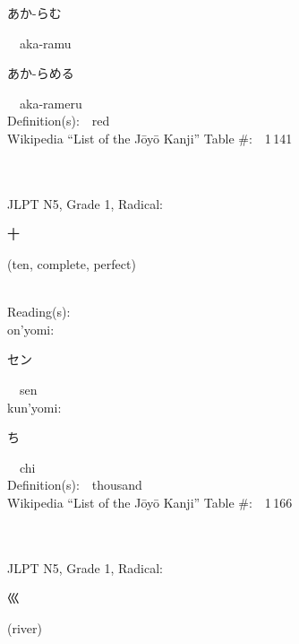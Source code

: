 \begin{multicols}{2}
{\hspace*{2em}}{\begin{CJK}{UTF8}{min} あか-らむ \end{CJK}}\ \ aka-ramu\ \ \\
{\hspace*{2em}}{\begin{CJK}{UTF8}{min} あか-らめる \end{CJK}}\ \ aka-rameru\ \ \\
Definition(s):\ \ red \\
Wikipedia ``List of the J\=oy\=o Kanji'' Table \#:\ \ 1\,141 \\
\ \ \\
{\fontsize{34pt}{40pt}  }\ \ \\  %
{JLPT N5, Grade 1, Radical:\ \ {\begin{CJK}{UTF8}{min} 十 \end{CJK}} (ten, complete, perfect) } \\
Reading(s):\ \ \\
{\hspace*{1em}}on'yomi:\ \ \\
{\hspace*{2em}}{\begin{CJK}{UTF8}{min} セン \end{CJK}}\ \ sen\ \ \\
{\hspace*{1em}}kun'yomi:\ \ \\
{\hspace*{2em}}{\begin{CJK}{UTF8}{min} ち \end{CJK}}\ \ chi\ \ \\
Definition(s):\ \ thousand \\
Wikipedia ``List of the J\=oy\=o Kanji'' Table \#:\ \ 1\,166 \\
\ \ \\
{\fontsize{34pt}{40pt}  }\ \ \\  %
{JLPT N5, Grade 1, Radical:\ \ {\begin{CJK}{UTF8}{min} 巛 \end{CJK}} (river) } \\

\end{multicols}
